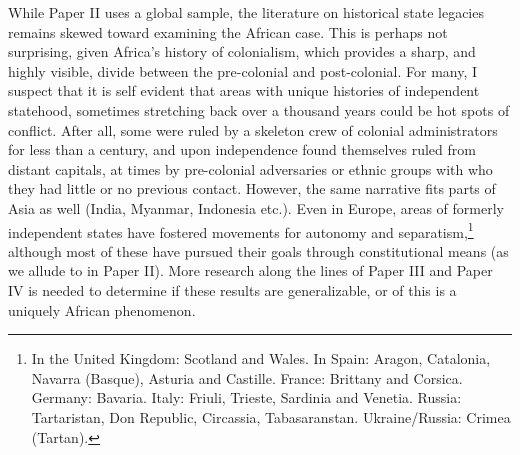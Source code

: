 While Paper II uses a global sample, the literature on historical state legacies
remains skewed toward examining the African case. This is perhaps not
surprising, given Africa's history of colonialism, which provides a sharp, and
highly visible, divide between the pre-colonial and post-colonial. For many, I
suspect that it is self evident that areas with unique histories of independent
statehood, sometimes stretching back over a thousand years could be hot spots of
conflict. After all, some were ruled by a skeleton crew of colonial
administrators \citep{englebert2013inside} for less than a century, and upon
independence found themselves ruled from distant capitals, at times by
pre-colonial adversaries or ethnic groups with who they had little or no
previous contact. However, the same narrative fits parts of Asia as well (India,
Myanmar, Indonesia etc.). Even in Europe, areas of formerly independent states
have fostered movements for autonomy and separatism,\footnote{In the United
	Kingdom: Scotland and Wales. In Spain: Aragon, Catalonia, Navarra
	(Basque), Asturia and Castille. France: Brittany and Corsica. Germany:
	Bavaria. Italy: Friuli, Trieste, Sardinia and Venetia. Russia:
Tartaristan, Don Republic, Circassia, Tabasaranstan. Ukraine/Russia: Crimea
(Tartan).} although most of these have pursued their goals through
constitutional means (as we allude to in Paper II). More research along the
lines of Paper III and Paper IV is needed to determine if these results are
generalizable, or of this is a uniquely African phenomenon.





